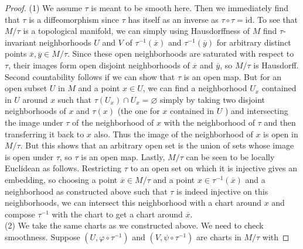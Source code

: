 \documentclass[reqno]{amsart}
\theoremstyle{definition}
\theoremstyle{remark}
\newcommand{\id}{{\mathrm{id}}}
\begin{document}
    \begin{proof}
        (1) We assume $\tau$ is meant to be smooth here.
        Then we immediately find that
         $\tau$ is a diffeomorphism since
         $\tau$ has itself as an inverse as
         $\tau \circ \tau = \id$.
         To see that $M / \tau$ is a topological manifold,
         we can simply using Hausdorffness of $M$ find
         $\tau$-invariant neighborhoods
         $U$ and $V$ of
         $\tau^{-1}(\overline{x})$ and
         $\tau^{-1}\left( \overline{y} \right) $ for
         arbitrary distinct points $\overline{x},\overline{y}
         \in M / \tau$. Since these open neighborhoods
         are saturated with respect to $\tau$,
         their images form open disjoint neighborhoods
         of $\overline{x}$ and $\overline{y}$, so
         $M / \tau$ is Hausdorff.
         Second countability follows if we can show that
         $\tau$ is an open map. 
         But for an open subset $U$ in $M$ and
         a point $x \in U$, we can find a neighborhood
         $U_x$ contained in
         $U$ around $x$ such that $\tau (U_x) \cap U_x = \varnothing$ 
         simply by taking two disjoint neighborhoods of
         $x$ and $\tau(x)$ (the one for
         $x$ contained in $U$ ) and intersecting
         the image under $\tau$ of the neighborhood of $x$ with
         the neighborhood of $\tau$ and then transferring it
         back to $x$ also. Thus the image
         of the neighborhood of $x$ is open in
         $M / \tau$. But this shows that an arbitrary open
         set is the union of sets whose image is
         open under $\tau$, so
         $\tau$ is an open map. 
         Lastly, $M / \tau$ can be seen to be
         locally Euclidean as follows. 
         Restricting $\tau$ to an open set
         on which it is injective gives an embedding,
         so choosing a point $\overline{x} \in M / \tau$ and
         a point $x \in \tau^{-1}\left( \overline{x} \right) $ 
         and a neighborhood as constructed above
         such that $\tau$ is indeed injective
         on this neighborhoods, we can intersect this
         neighborhood with a chart around $x$ and compose
         $\tau^{-1}$ with the chart to get a chart around
         $\overline{x}$.\\
         \linebreak
         (2) We take the same charts as we constructed above.
         We need to check smoothness. 
         Suppose
         $\left( U, \varphi \circ \tau^{-1} \right) $ 
         and $\left( V, \psi \circ \tau^{-1} \right) $ 
         are charts in $M / \tau$ with

\end{proof}
\end{document}
